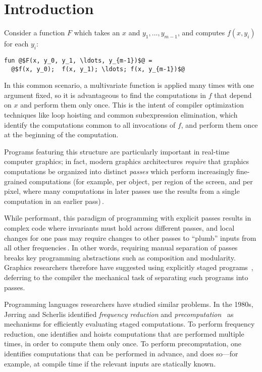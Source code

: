 \section{Introduction}

Consider a function $F$ which takes an $x$ and $y_1,\dots,y_{m-1}$, and computes
$f(x,y_i)$ for each $y_i$:
\begin{lstlisting}
fun @$F(x, y_0, y_1, \ldots, y_{m-1})$@ = 
  @$f(x, y_0);  f(x, y_1); \ldots; f(x, y_{m-1})$@
\end{lstlisting}
%
In this common scenario, a multivariate function is applied many times with one
argument fixed, so it is advantageous to find the computations in $f$ that
depend on $x$ and perform them only once. This is the intent of compiler
optimization techniques like loop hoisting and common subexpression elimination,
which identify the computations common to all invocations of $f$, and perform
them once at the beginning of the computation.

Programs featuring this structure are particularly important in real-time
computer graphics; in fact, modern graphics architectures \emph{require} that
graphics computations be organized into distinct {\em passes} which perform
increasingly fine-grained computations (for example, per object, per region of
the screen, and per pixel, where many computations in later passes use the
results from a single computation in an earlier pass)\,\cite{OpenGL4Spec}.

While performant, this paradigm of programming with explicit passes results in
complex code where invariants must hold across different passes, and local
changes for one pass may require changes to other passes to ``plumb'' inputs
from all other frequencies\,\cite{Foley:2011}.
%
In other words, requiring manual separation of passes breaks key programming
abstractions such as composition and modularity.
%
Graphics researchers therefore have suggested using explicitly staged programs
\,\cite{Proudfoot:2001,Foley:2011,He:2014}, deferring to the compiler the
mechanical task of separating such programs into passes.

Programming languages researchers have studied similar problems. In the 1980s,
J{\o}rring and Scherlis identified {\em frequency reduction} and {\em
precomputation}~\cite{JS86-staging} as mechanisms for efficiently evaluating
staged computations. To perform frequency reduction, one identifies and hoists
computations that are performed multiple times, in order to compute them only
once. To perform precomputation, one identifies computations that can be
performed in advance, and does so---for example, at compile time if the relevant
inputs are statically known.

